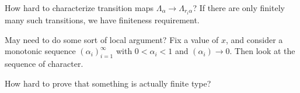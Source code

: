 \documentclass[11pt, a4paper]{memoir}
\theoremstyle{change}
\theoremstyle{plain}
\theoremstyle{nonumberplain}
\numberwithin{equation}{section}
\begin{document}
How hard to characterize transition maps $\Lambda_\alpha\to\Lambda_{r_i\alpha}$?
If there are only finitely many such transitions, we have finiteness requirement.

May need to do some sort of local argument?
Fix a value of $x$, and consider a monotonic sequence $(\alpha_i)_{i=1}^\infty$ with $0<\alpha_i<1$ and $(\alpha_i)\to 0$.
Then look at the sequence of character.

How hard to prove that something is actually finite type?
\end{document}
